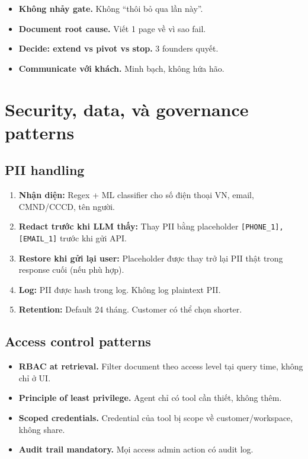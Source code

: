 \documentclass[11pt,a4paper]{article}
\begin{document}
\begin{itemize}
\item \textbf{Không nhảy gate.} Không ``thôi bỏ qua lần này''.
\item \textbf{Document root cause.} Viết 1 page về vì sao fail.
\item \textbf{Decide: extend vs pivot vs stop.} 3 founders quyết.
\item \textbf{Communicate với khách.} Minh bạch, không hứa hão.
\end{itemize}

\clearpage

\section{Security, data, và governance patterns}

\subsection{PII handling}

\begin{enumerate}
\item \textbf{Nhận diện:} Regex + ML classifier cho số điện thoại VN, email, CMND/CCCD, tên người.
\item \textbf{Redact trước khi LLM thấy:} Thay PII bằng placeholder \texttt{[PHONE\_1], [EMAIL\_1]} trước khi gửi API.
\item \textbf{Restore khi gửi lại user:} Placeholder được thay trở lại PII thật trong response cuối (nếu phù hợp).
\item \textbf{Log:} PII được hash trong log. Không log plaintext PII.
\item \textbf{Retention:} Default 24 tháng. Customer có thể chọn shorter.
\end{enumerate}

\subsection{Access control patterns}

\begin{itemize}
\item \textbf{RBAC at retrieval.} Filter document theo access level tại query time, không chỉ ở UI.
\item \textbf{Principle of least privilege.} Agent chỉ có tool cần thiết, không thêm.
\item \textbf{Scoped credentials.} Credential của tool bị scope về customer/workspace, không share.
\item \textbf{Audit trail mandatory.} Mọi access admin action có audit log.
\end{itemize}
\end{document}
